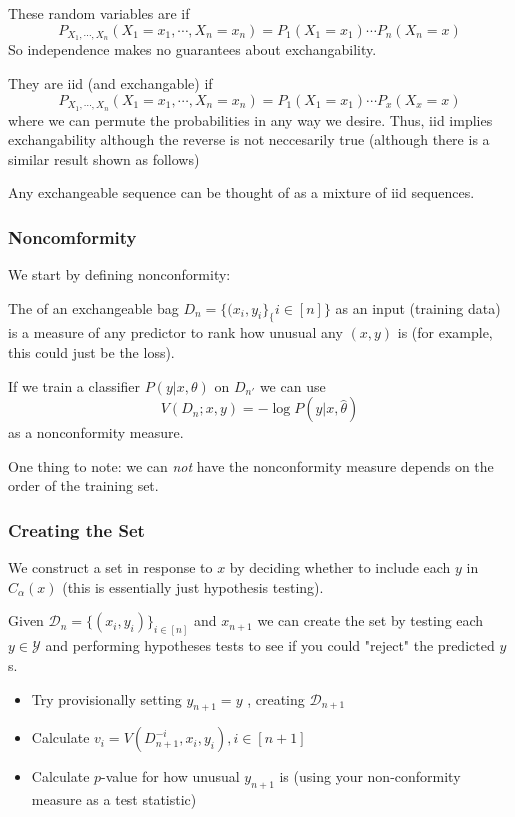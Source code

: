 \documentclass[11pt]{scrartcl}
\begin{document}
These random variables are  if $$P_{X_1,\cdots,X_n}(X_1=x_1,\cdots,X_n=x_n)=P_1(X_1=x_1)\cdots P_n(X_n=x)$$
So independence makes no guarantees about exchangability.

They are iid (and exchangable) if  
$$P_{X_1,\cdots,X_n}(X_1=x_1,\cdots,X_n=x_n)=P_1(X_1=x_1)\cdots P_x(X_x=x)$$ where we can permute the probabilities in any way we desire. Thus, iid implies exchangability although the reverse is not neccesarily true (although there is a similar result shown as follows)

\begin{thm}
Any exchangeable sequence can be thought of as a mixture of iid sequences. 
\end{thm}

\subsubsection{Noncomformity}
We start by defining nonconformity:
\begin{defn}
The  of an exchangeable bag $D_n=\{(x_i,y_i\}_\{i \in [n]\}$ as an input (training data) is a measure of any predictor to rank how unusual any $(x,y)$ is (for example, this could just be the loss). 
\end{defn}

\begin{ex}
If we train a classifier $P(y|x,\theta)$ on $D_{n'}$ we can use $$V(D_n;x,y)=-\log{P(y|x,\hat{\theta})}$$
as a nonconformity measure.
\end{ex}

One thing to note: we can \textit{not} have the nonconformity measure depends on the order of the training set. 

\subsubsection{Creating the Set}
We construct a set in response to $x$ by deciding whether to include each $y$ in $C_\alpha(x)$ (this is essentially just hypothesis testing).

Given $\mathcal{D}_n=\{(x_i,y_i)\}_{i \in [n]}$ and $x_{n+1}$ we can create the set by testing each $y \in \mathcal{Y}$ and performing hypotheses tests to see if you could "reject" the predicted $y$s. 
\begin{itemize}
    \item Try provisionally setting $y_{n+1}=y$ , creating $\mathcal{D}_{n+1}$
    \item Calculate $v_i=V(D^{-i}_{n+1}, x_i,y_i), i \in [n+1]$
    \item Calculate $p$-value for how unusual $y_{n+1}$ is (using your non-conformity measure as a test statistic)
\end{itemize}
\end{document}
